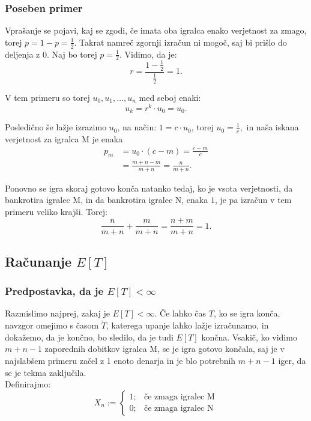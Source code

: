 \documentclass[12pt, a4paper]{article}
\begin{document}
\subsubsection{Poseben primer}
\label{Poseben primer za  r = 1}
Vprašanje se pojavi, kaj se zgodi, če imata oba igralca enako verjetnost za zmago, torej $p = 1 - p = \frac{1}{2}$. Takrat namreč zgornji izračun ni mogoč, saj bi prišlo do deljenja z $0$. Naj bo torej $p = \frac{1}{2}$. Vidimo, da je: 
$$r = \frac{1 - \frac{1}{2}}{\frac{1}{2}} = 1.$$

V tem primeru so torej $u_0, u_1, \dotso, u_n$ med seboj enaki:
$$u_k = r^k \cdot u_0 = u_0.$$

Posledično še lažje izrazimo $u_0$, na način:
$1 = c\cdot u_0$, torej $u_0 = \frac{1}{c},$
in naša iskana verjetnost za igralca M  je enaka
\begin{equation*}
\begin{split}
p_m &= u_0 \cdot (c - m) = \frac{c-m}{c}  \\
		&= \frac{m + n - m}{m + n} = \frac{n}{m + n}.
\end{split} 
\end{equation*}

Ponovno se igra skoraj gotovo konča natanko tedaj, ko je vsota verjetnosti, da bankrotira igralec M, in da bankrotira igralec N, enaka $1$, je pa izračun v tem primeru veliko krajši. Torej: 
$$\frac{n}{m + n} + \frac{m}{m + n} = \frac{n + m}{m+ n} = 1.$$


\subsection{Računanje $E[T]$}
\subsubsection{Predpostavka, da je $E[T] < \infty$}
Razmislimo najprej, zakaj je $E[T] <\infty$. Če lahko čas $T$, ko se igra konča, navzgor omejimo s časom $\widetilde{T}$, katerega upanje lahko lažje izračunamo, in dokažemo, da je končno, bo sledilo, da je tudi $E[T]$ končna. Vsakič, ko vidimo $m+n-1$ zaporednih dobitkov igralca M, se je igra gotovo končala, saj je v najslabšem primeru začel z 1 enoto denarja in je blo potrebnih $m+n-1$ iger, da se je tekma zaključila.\\

Definirajmo: 
\[
X_n := \left\{
\begin{array}{rl}
1; & \textrm{če zmaga igralec M}\\
0; & \textrm{če zmaga igralec N}
\end{array}
\right.
\]
\end{document}
